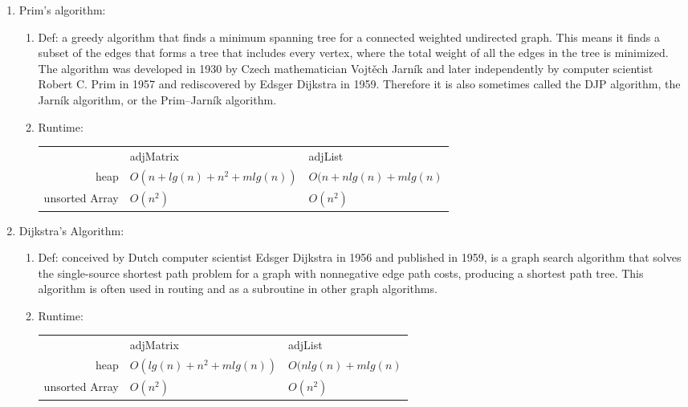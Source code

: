 \documentclass[12pt]{article}
\renewcommand{\=}[1]{\stackrel{#1}{=}} %
\theoremstyle{definition}
\theoremstyle{remark}
\begin{document}
\begin{enumerate}
\begin{enumerate}
\begin{enumerate}
      \item Prim's algorithm:
        \begin{enumerate}
        \item Def: a greedy algorithm that finds a minimum spanning
          tree for a connected weighted undirected graph. This means
          it finds a subset of the edges that forms a tree that
          includes every vertex, where the total weight of all the
          edges in the tree is minimized. The algorithm was developed
          in 1930 by Czech mathematician Vojtěch Jarník and later
          independently by computer scientist Robert C. Prim in 1957
          and rediscovered by Edsger Dijkstra in 1959. Therefore it is
          also sometimes called the DJP algorithm, the Jarník
          algorithm, or the Prim–Jarník algorithm.
        \item Runtime:
          \begin{tabular*}{1.0\linewidth}{r l l}
                  & adjMatrix & adjList\\
             heap & $O(n+lg(n)+n^2+mlg(n))$ & $O(n+nlg(n)+mlg(n)$\\
             unsorted Array & $O(n^2)$ & $O(n^2)$
          \end{tabular*}

        \end{enumerate}

      \item Dijkstra’s Algorithm:
        \begin{enumerate}
        \item Def: conceived by Dutch computer scientist Edsger Dijkstra in 1956 and published in 1959, is a graph search algorithm that solves the single-source shortest path problem for a graph with nonnegative edge path costs, producing a shortest path tree. This algorithm is often used in routing and as a subroutine in other graph algorithms.
        \item Runtime:
          \begin{tabular*}{1.0\linewidth}{r l l}
                  & adjMatrix & adjList\\
             heap & $O(lg(n)+n^2+mlg(n))$ & $O(nlg(n)+mlg(n)$\\
             unsorted Array & $O(n^2)$ & $O(n^2)$
          \end{tabular*}
        \end{enumerate}


\end{enumerate}
\end{enumerate}
\end{enumerate}
\end{document}
